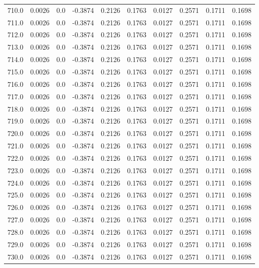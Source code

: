 \begin{longtable}{lrrrrrrrrr}
710.0 & 0.0026 & 0.0 & -0.3874 & 0.2126 & 0.1763 & 0.0127 & 0.2571 & 0.1711 & 0.1698 \\
711.0 & 0.0026 & 0.0 & -0.3874 & 0.2126 & 0.1763 & 0.0127 & 0.2571 & 0.1711 & 0.1698 \\
712.0 & 0.0026 & 0.0 & -0.3874 & 0.2126 & 0.1763 & 0.0127 & 0.2571 & 0.1711 & 0.1698 \\
713.0 & 0.0026 & 0.0 & -0.3874 & 0.2126 & 0.1763 & 0.0127 & 0.2571 & 0.1711 & 0.1698 \\
714.0 & 0.0026 & 0.0 & -0.3874 & 0.2126 & 0.1763 & 0.0127 & 0.2571 & 0.1711 & 0.1698 \\
715.0 & 0.0026 & 0.0 & -0.3874 & 0.2126 & 0.1763 & 0.0127 & 0.2571 & 0.1711 & 0.1698 \\
716.0 & 0.0026 & 0.0 & -0.3874 & 0.2126 & 0.1763 & 0.0127 & 0.2571 & 0.1711 & 0.1698 \\
717.0 & 0.0026 & 0.0 & -0.3874 & 0.2126 & 0.1763 & 0.0127 & 0.2571 & 0.1711 & 0.1698 \\
718.0 & 0.0026 & 0.0 & -0.3874 & 0.2126 & 0.1763 & 0.0127 & 0.2571 & 0.1711 & 0.1698 \\
719.0 & 0.0026 & 0.0 & -0.3874 & 0.2126 & 0.1763 & 0.0127 & 0.2571 & 0.1711 & 0.1698 \\
720.0 & 0.0026 & 0.0 & -0.3874 & 0.2126 & 0.1763 & 0.0127 & 0.2571 & 0.1711 & 0.1698 \\
721.0 & 0.0026 & 0.0 & -0.3874 & 0.2126 & 0.1763 & 0.0127 & 0.2571 & 0.1711 & 0.1698 \\
722.0 & 0.0026 & 0.0 & -0.3874 & 0.2126 & 0.1763 & 0.0127 & 0.2571 & 0.1711 & 0.1698 \\
723.0 & 0.0026 & 0.0 & -0.3874 & 0.2126 & 0.1763 & 0.0127 & 0.2571 & 0.1711 & 0.1698 \\
724.0 & 0.0026 & 0.0 & -0.3874 & 0.2126 & 0.1763 & 0.0127 & 0.2571 & 0.1711 & 0.1698 \\
725.0 & 0.0026 & 0.0 & -0.3874 & 0.2126 & 0.1763 & 0.0127 & 0.2571 & 0.1711 & 0.1698 \\
726.0 & 0.0026 & 0.0 & -0.3874 & 0.2126 & 0.1763 & 0.0127 & 0.2571 & 0.1711 & 0.1698 \\
727.0 & 0.0026 & 0.0 & -0.3874 & 0.2126 & 0.1763 & 0.0127 & 0.2571 & 0.1711 & 0.1698 \\
728.0 & 0.0026 & 0.0 & -0.3874 & 0.2126 & 0.1763 & 0.0127 & 0.2571 & 0.1711 & 0.1698 \\
729.0 & 0.0026 & 0.0 & -0.3874 & 0.2126 & 0.1763 & 0.0127 & 0.2571 & 0.1711 & 0.1698 \\
730.0 & 0.0026 & 0.0 & -0.3874 & 0.2126 & 0.1763 & 0.0127 & 0.2571 & 0.1711 & 0.1698 \\

\end{longtable}
